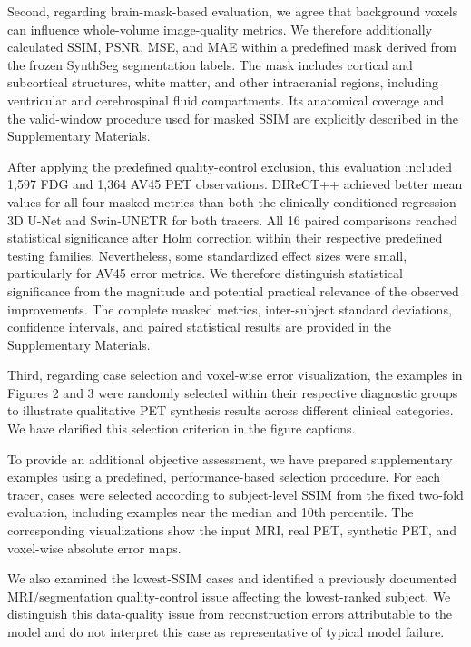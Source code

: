 {Second, regarding brain-mask-based evaluation, we agree that background voxels can influence whole-volume image-quality metrics. We therefore additionally calculated SSIM, PSNR, MSE, and MAE within a predefined mask derived from the frozen SynthSeg segmentation labels. The mask includes cortical and subcortical structures, white matter, and other intracranial regions, including ventricular and cerebrospinal fluid compartments. Its anatomical coverage and the valid-window procedure used for masked SSIM are explicitly described in the Supplementary Materials.

After applying the predefined quality-control exclusion, this evaluation included 1,597 FDG and 1,364 AV45 PET observations. DIReCT++ achieved better mean values for all four masked metrics than both the clinically conditioned regression 3D U-Net and Swin-UNETR for both tracers. All 16 paired comparisons reached statistical significance after Holm correction within their respective predefined testing families. Nevertheless, some standardized effect sizes were small, particularly for AV45 error metrics. We therefore distinguish statistical significance from the magnitude and potential practical relevance of the observed improvements. The complete masked metrics, inter-subject standard deviations, confidence intervals, and paired statistical results are provided in the Supplementary Materials.

Third, regarding case selection and voxel-wise error visualization, the examples in Figures 2 and 3 were randomly selected within their respective diagnostic groups to illustrate qualitative PET synthesis results across different clinical categories. We have clarified this selection criterion in the figure captions.

To provide an additional objective assessment, we have prepared supplementary examples using a predefined, performance-based selection procedure. For each tracer, cases were selected according to subject-level SSIM from the fixed two-fold evaluation, including examples near the median and 10th percentile. The corresponding visualizations show the input MRI, real PET, synthetic PET, and voxel-wise absolute error maps.

We also examined the lowest-SSIM cases and identified a previously documented MRI/segmentation quality-control issue affecting the lowest-ranked subject. We distinguish this data-quality issue from reconstruction errors attributable to the model and do not interpret this case as representative of typical model failure.

}
